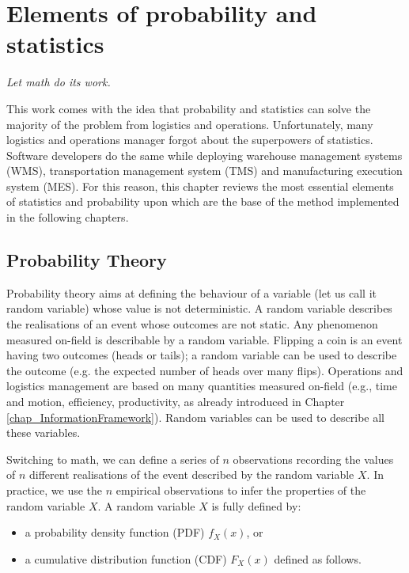 \chapter{Elements of probability and statistics}

\epigraph{\textit{Let math do its work.}}{}

This work comes with the idea that probability and statistics can solve the majority of the problem from logistics and operations. Unfortunately, many logistics and operations manager forgot about the superpowers of statistics. Software developers do the same while deploying warehouse management systems (WMS), transportation management system (TMS) and manufacturing execution system (MES). For this reason, this chapter reviews the most essential elements of statistics and probability upon which are the base of the method implemented in the following chapters. 

\section{Probability Theory}
Probability theory aims at defining the behaviour of a variable (let us call it random variable) whose value is not deterministic. A random variable describes the realisations of an event whose outcomes are not static. Any phenomenon measured on-field is describable by a random variable. Flipping a coin is an event having two outcomes (heads or tails); a random variable can be used to describe the outcome (e.g. the expected number of heads over many flips). Operations and logistics management are based on many quantities measured on-field (e.g., time and motion, efficiency, productivity, as already introduced in Chapter \ref{chap_InformationFramework}). Random variables can be used to describe all these variables. 

Switching to math, we can define a series of $n$ observations recording the values of $n$ different realisations of the event described by the random variable $X$. In practice, we use the $n$ empirical observations to infer the properties of the random variable $X$. A random variable $X$ is fully defined by:
\begin{itemize}
    \item 	a probability density function (PDF) $f_X (x)$, or
    \item 	a cumulative distribution function (CDF) $F_X (x)$ defined as follows.
\end{itemize}

